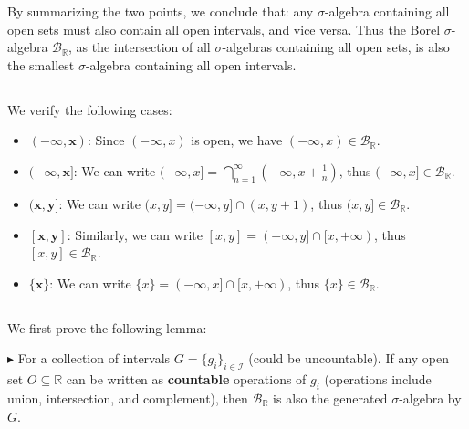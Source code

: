 \documentclass[11pt,a4paper]{article}
\numberwithin{equation}{section}%
\newenvironment{point}{\raggedright$\blacktriangleright$}{}
\begin{document}
By summarizing the two points, we conclude that: any $ \sigma $-algebra containing all open sets must also contain all open intervals, and vice versa. Thus the Borel $ \sigma $-algebra $ \mathcal{B}_\mathbb{R} $, as the intersection of all $ \sigma $-algebras containing all open sets, is also the smallest $ \sigma $-algebra containing all open intervals.


\subsection{}

We verify the following cases:
\begin{itemize}[topsep=2pt,itemsep=0pt]
    \item $ \mathbf{(-\infty, x)} $: Since $ (-\infty, x) $ is open, we have $ (-\infty, x)\in \mathcal{B}_{\mathbb{R}} $.
    \item $ \mathbf{(-\infty,x]} $: We can write $ (-\infty,x] = \bigcap_{n=1}^\infty (-\infty,x+\frac{1}{n}) $, thus $ (-\infty,x]\in \mathcal{B}_{\mathbb{R}} $.

    \item $ \mathbf{(x,y]}$: We can write $ (x,y] = (-\infty,y] \cap (x,y+1) $, thus $ (x,y]\in \mathcal{B}_{\mathbb{R}} $.
    \item $ \mathbf{[x,y]} $: Similarly, we can write $ [x,y] = (-\infty,y] \cap [x,+\infty) $, thus $ [x,y]\in \mathcal{B}_{\mathbb{R}} $.
    \item $ \mathbf{\{x\}} $: We can write $ \{x\} = (-\infty,x] \cap [x,+\infty) $, thus $ \{x\}\in \mathcal{B}_{\mathbb{R}} $.
\end{itemize}

\subsection{}

We first prove the following lemma:

\begin{point}
    For a collection of intervals $ G=\{g_i\}_{i\in\mathcal{I}} $ (could be uncountable). If any open set $ O\subseteq \mathbb{R} $ can be written as \textbf{countable} operations of $ g_i $ (operations include union, intersection, and complement), then $ \mathcal{B}_\mathbb{R} $ is also the generated $ \sigma $-algebra by $ G $.
\end{point}
\end{document}

